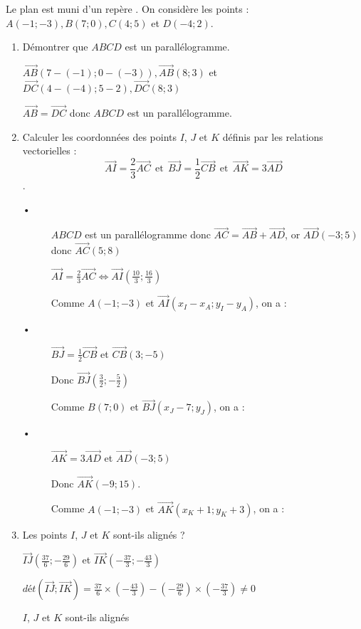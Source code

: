 
Le plan est muni d'un repère \Oij. 
On considère les points : $A(-1;-3), B(7;0), C(4;5)$ et $D(-4;2)$.
\begin{enumerate}
\item Démontrer que $ABCD$ est un parallélogramme.

$\overrightarrow{AB}(7-(-1);0-(-3)),\overrightarrow{AB}(8;3)$ et $\overrightarrow{DC}(4-(-4);5-2),\overrightarrow{DC}(8;3)$

$\overrightarrow{AB} = \overrightarrow{DC}$ donc $ABCD$ est un parallélogramme.



\item  Calculer les coordonnées des points $I$, $J$ et $K$ définis par les relations vectorielles : $$\overrightarrow{AI}=\frac{2}{3}\overrightarrow{AC} ~~ \text{et}~~\overrightarrow{BJ}=\frac{1}{2}\overrightarrow{CB} ~~ \text{et}~~ \overrightarrow{AK}=3\overrightarrow{AD}$$.

\begin{description}
\item[•] $ABCD$ est un parallélogramme donc $\overrightarrow{AC} = \overrightarrow{AB} + \overrightarrow{AD}$, or $\overrightarrow{AD}(-3;5)$ donc $\overrightarrow{AC}(5;8)$ 

$\overrightarrow{AI}=\frac{2}{3}\overrightarrow{AC} \Longleftrightarrow \overrightarrow{AI} \left( \frac{10}{3};\frac{16}{3}\right)$

Comme $A(-1;-3)$ et $\overrightarrow{AI}(x_I-x_A;y_I-y_A)$, on a : 


\item[•] $\overrightarrow{BJ}=\frac{1}{2}\overrightarrow{CB}$ et $\overrightarrow{CB}(3;-5)$  

Donc $\overrightarrow{BJ} \left( \frac{3}{2};-\frac{5}{2}\right)$

Comme $B(7;0)$ et $\overrightarrow{BJ}(x_J-7;y_J)$, on a : 

\item[•] $\overrightarrow{AK}=3\overrightarrow{AD}$ et $\overrightarrow{AD}(-3;5)$  

Donc $\overrightarrow{AK} (-9;15)$.

Comme $A(-1;-3)$ et $\overrightarrow{AK}(x_K+1;y_K+3)$, on a : 

\end{description}

\item  Les points $I$, $J$ et $K$ sont-ils alignés ?

$\overrightarrow{IJ}\left(\frac{37}{6};-\frac{29}{6}\right)$ et $\overrightarrow{IK}\left(- \frac{37}{3};-\frac{43}{3}\right)$


$dét\left(\overrightarrow{IJ} ; \overrightarrow{IK}\right)=\frac{37}{6} \times \left(-\frac{43}{3}\right)-\left(-\frac{29}{6}\right)\times\left(- \frac{37}{3}\right) \neq 0 $

$I$, $J$ et $K$ sont-ils alignés 

\end{enumerate}